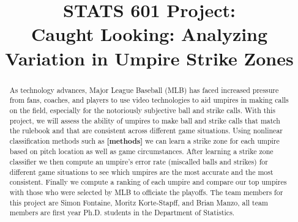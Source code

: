 \documentclass[bj, preprint]{imsart}
\begin{document}
\begin{frontmatter}

\title{{\Large STATS 601 Project:} \\ 
\bf Caught Looking: Analyzing Variation in Umpire Strike Zones}




\begin{abstract}
As technology advances, Major League Baseball (MLB) has faced increased pressure from fans, coaches, and players to use video technologies to aid umpires in making calls on the field, especially for the notoriously subjective ball and strike calls.
With this project, we will assess the ability of umpires to make ball and strike calls that match the rulebook and that are consistent across different game situations. 
Using nonlinear classification methods such as \textbf{[methods]} we can learn a strike zone for each umpire based on pitch location as well as game circumstances. 
After learning a strike zone classifier we then compute an umpire's error rate (miscalled balls and strikes) for different game situations to see which umpires are the most accurate and the most consistent. 
Finally we compute a ranking of each umpire and compare our top umpires with those who were selected by MLB to officiate the playoffs.
The team members for this project are Simon Fontaine, Moritz Korte-Stapff, and Brian Manzo, all team members are first year Ph.D. students in the Department of Statistics.
\end{abstract}

\end{frontmatter}


\end{document}

